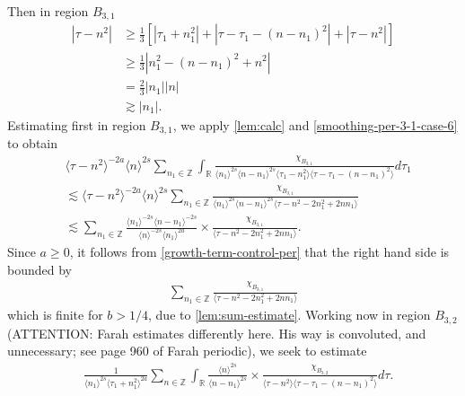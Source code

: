 \documentclass[12pt,reqno]{amsart}
\numberwithin{equation}{section}  %
\numberwithin{figure}{section}
\newcommand{\rr}{\mathbb{R}}
\newcommand{\zz}{\mathbb{Z}}
\theoremstyle{plain}
\theoremstyle{definition}
\theoremstyle{remark}
\begin{document}
Then in region $B_{3,1}$
\begin{equation}
\begin{split}
  | \tau - n^{2} |
  & \ge \frac{1}{3}\left[ | \tau_{1} + n_{1}^{2} | + | \tau -
  \tau_{1} - (n - n_{1})^{2}
  | + | \tau - n^{2} | \right]
  \\
  & \ge \frac{1}{3} |  n_{1}^{2} - (n - n_{1})^{2} + n^{2} |
  \\
  & = \frac{2}{3} | n_{1} | | n |
  \\
  & \gtrsim | n_{1} |.
\end{split}
\label{smoothing-per-3-1-case-6}
\end{equation}
%
%
Estimating first in region
$B_{3,1}$, we apply \autoref{lem:calc} and \eqref{smoothing-per-3-1-case-6}
to obtain
%
%
%
%
\begin{equation}
  \label{region-a31-case-6}
\begin{split}
& \langle \tau - n^{2}  \rangle ^{-2a} \langle n
    \rangle ^{2s}
    \sum_{n_{1} \in \zz} \int_{\rr} \frac{\chi_{B_{3,1}}}{ \langle n_{1} \rangle ^{2s} \langle n-n_{1} \rangle ^{2s} 
\langle \tau_{1} - n_{1}^{2}  \rangle \langle  \tau - \tau_{1} - (n -
n_{1})^{2}  \rangle}
d \tau_1 
\\
& \lesssim \langle \tau - n^{2} \rangle ^{-2a} \langle n \rangle ^{2s}
\sum_{n_{1} \in
\zz}  \frac{\chi_{B_{3,1}}}{\langle n_{1} \rangle ^{2s} \langle n - n_{1} \rangle
^{2s} \langle \tau - n^{2} - 2n_{1}^{2} + 2nn_{1}  \rangle }
\\
& \lesssim 
\sum_{n_{1} \in
\zz}  \frac{\langle n_1 \rangle ^{-2s} \langle n - n_{1} \rangle ^{-2s}}{\langle
n \rangle ^{-2s} \langle n_{1} \rangle
^{2a}} \times \frac{\chi_{B_{3,1}}}{\langle \tau - n^{2} - 2n_{1}^{2} + 2nn_{1}
\rangle }.
\end{split}
\end{equation}
%
%
Since $a \ge 0$, it follows from \eqref{growth-term-control-per} that the right
hand side is bounded by
%
%
%
%
\begin{equation*}
\begin{split}
\sum_{n_{1} \in
\zz} \frac{\chi_{B_{3,1}}}{\langle \tau - n^{2} - 2n_{1}^{2} + 2nn_{1}
\rangle }
\end{split}
\end{equation*}
%
%
%
%
%
%
which is finite for $b > 1/4$, due to \autoref{lem:sum-estimate}. 
Working now in region $B_{3,2}$ (ATTENTION: Farah estimates differently here. His
way is convoluted, and unnecessary; see page 960 of Farah periodic), we seek to estimate 
\begin{equation}
  \label{region-B-3-split-3}
\begin{split}
  &  \frac{1}{\langle n_{1} \rangle ^{2s}
  \langle \tau_{1} + n_{1}^{2} \rangle
  ^{2a}} \sum_{n \in \zz} \int_{\rr} \frac{\langle n \rangle ^{2s}}{\langle
  n - n_{1}\rangle ^{2s}}  \times \frac{\chi_{B_{3,2}}}{\langle
  \tau - n^{2} \rangle  \langle \tau - \tau_{1} - (n - n_{1})^{2} \rangle
  } d \tau.
\end{split}
\end{equation}
\end{document}
